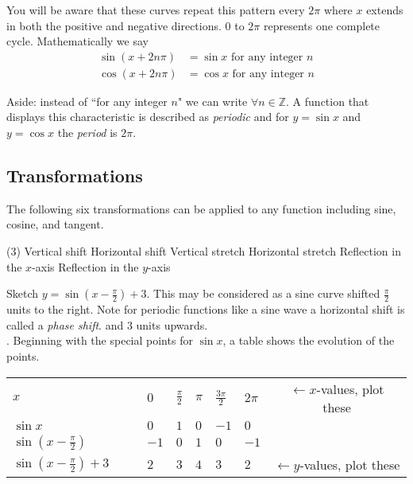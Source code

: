You will be aware that these curves repeat this pattern every $2 \pi $ where $x$ extends in both the positive and negative directions. $0$ to $2\pi $ represents one complete cycle. Mathematically we say
\begin{align*}\sin  \left (x +2 n \pi \right ) &  = \sin  x\text{\  for any integer }n \\
	\cos  \left (x +2 n \pi \right ) &  = \cos  x\text{\  for any integer }n\end{align*}

Aside: instead of ``for any integer $n$" we can write $ \forall n \in \mathbb{Z}$. A function that displays this characteristic is described as \emph{periodic} and for $y =\sin x$ and $y =\cos x$ the \emph{period} is $2 \pi $. 

\subsection*{Transformations}
The following six transformations can be applied to any function including sine, cosine, and tangent.
\begin{tasks}[style=itemize](3)
\task Vertical shift 
\task Horizontal shift 
\task Vertical stretch 
\task Horizontal stretch 
\task Reflection in the $x$-axis 
\task Reflection in the $y$-axis 
\end{tasks}

\example Sketch $y =\sin  \left (x -\frac{\pi }{2}\right ) +3$. This may be considered as a sine curve shifted $\frac{\pi }{2}$ units to the right. Note for periodic functions like a sine wave a horizontal shift is called a \textit{phase shift}. and $3$ units upwards.\\ 
. Beginning with the special points for $\sin x$, a table shows the evolution of the points. \\
\begin{tabular}{llllllc}\cmidrule{1-6}
	$x$  & $0$  & $\frac{\pi }{2}$  & $\pi $  & $\frac{3 \pi }{2}$  & $2 \pi $ & $\leftarrow x$-values, plot these \\
	\cmidrule{1-6}
	$\sin  x$  & $0$  & $1$  & $0$  & $ -1$  & $0$ & \\
	\cmidrule{1-6}
	$\sin  \left (x -\frac{\pi }{2}\right )$  & $ -1$  & $0$  & $1$  & $0$  & $ -1$&  \\
	\cmidrule{1-6}
	$\sin  \left (x -\frac{\pi }{2}\right ) +3\qquad$  & $2$  & $3$  & $4$  & $3$  & $2$&$\leftarrow y$-values, plot these  \\
	\cmidrule{1-6}
\end{tabular}

